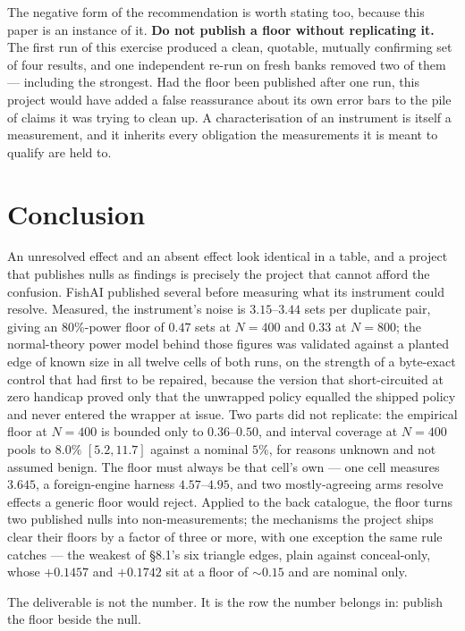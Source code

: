 \documentclass[11pt]{article}
\begin{document}
The negative form of the recommendation is worth stating too, because this paper is an instance of
it. \textbf{Do not publish a floor without replicating it.} The first run of this exercise produced
a clean, quotable, mutually confirming set of four results, and one independent re-run on fresh banks
removed two of them --- including the strongest. Had the floor been published after one run, this
project would have added a false reassurance about its own error bars to the pile of claims it was
trying to clean up. A characterisation of an instrument is itself a measurement, and it inherits
every obligation the measurements it is meant to qualify are held to.

\section{Conclusion}

An unresolved effect and an absent effect look identical in a table, and a project that publishes
nulls as findings is precisely the project that cannot afford the confusion. FishAI published
several before measuring what its instrument could resolve. Measured, the instrument's noise is
$3.15$--$3.44$ sets per duplicate pair, giving an 80\%-power floor of $0.47$ sets at $N=400$ and
$0.33$ at $N=800$; the normal-theory power model behind those figures was validated against a
planted edge of known size in all twelve cells of both runs, on the strength of a byte-exact control
that had first to be repaired, because the version that short-circuited at zero handicap proved only
that the unwrapped policy equalled the shipped policy and never entered the wrapper at issue. Two
parts did not replicate: the empirical floor at $N=400$ is bounded only to $0.36$--$0.50$, and
interval coverage at $N=400$ pools to $8.0\%$ $[5.2, 11.7]$ against a nominal $5\%$, for reasons
unknown and not assumed benign. The floor must always be that cell's own --- one cell measures
$3.645$, a foreign-engine harness $4.57$--$4.95$, and two mostly-agreeing arms resolve effects a
generic floor would reject. Applied to the back catalogue, the floor turns two published nulls into
non-measurements; the mechanisms the project ships clear their floors by a factor of three or more,
with one exception the same rule catches --- the weakest of \S8.1's six triangle edges, plain against
conceal-only, whose $+0.1457$ and $+0.1742$ sit at a floor of ${\sim}0.15$ and are nominal only.

The deliverable is not the number. It is the row the number belongs in: publish the floor beside the
null.
\end{document}
